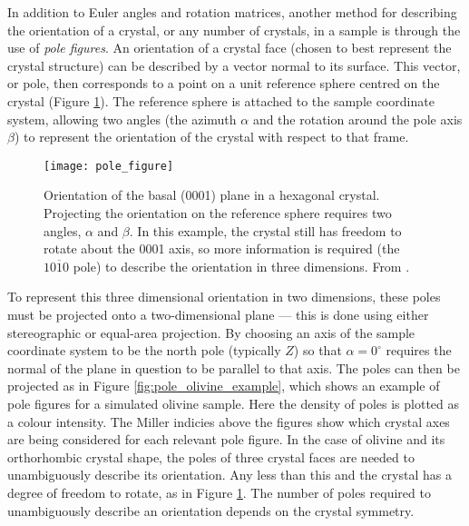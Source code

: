 \documentclass[a4paper,12pt,twoside]{report}
\numberwithin{equation}{chapter}
\begin{document}
In addition to Euler angles and rotation matrices, another method for describing the orientation of a crystal, or any number of crystals, in a sample is through the use of \emph{pole figures}. An orientation of a crystal face (chosen to best represent the crystal structure) can be described by a vector normal to its surface. This vector, or pole, then corresponds to a point on a unit reference sphere centred on the crystal (Figure \ref{fig:spherical_orientation}). The reference sphere is attached to the sample coordinate system, allowing two angles (the azimuth $\alpha$ and the rotation around the pole axis $\beta$) to represent the orientation of the crystal with respect to that frame.  




\begin{figure}[h!]
  \centering
    \texttt{[image: pole\_figure]}
  \caption[Pole figure visualisation]{Orientation of the basal (0001) plane in a hexagonal crystal. Projecting the orientation on the reference sphere requires two angles, $\alpha$ and $\beta$. In this example, the crystal still has freedom to rotate about the 0001 axis, so more information is required (the $\mathit{10\overline{1}0}$ pole) to describe the orientation in three dimensions. From \cite{Randle2000}.}
  \label{fig:spherical_orientation}
\end{figure}



To represent this three dimensional orientation in two dimensions, these poles must be projected onto a two-dimensional plane --- this is done using either stereographic or equal-area projection. By choosing an axis of the sample coordinate system to be the north pole (typically $Z$) so that $\alpha = 0^\circ$ requires the normal of the plane in question to be parallel to that axis. The poles can then be projected as in Figure \ref{fig:pole_olivine_example}, which shows an example of pole figures for a simulated olivine sample. Here the density of poles is plotted as a colour intensity. The Miller indicies above the figures show which crystal axes are being considered for each relevant pole figure. In the case of olivine and its orthorhombic crystal shape, the poles of three crystal faces are needed to unambiguously describe its orientation. Any less than this and the crystal has a degree of freedom to rotate, as in Figure \ref{fig:spherical_orientation}. The number of poles required to unambiguously describe an orientation depends on the crystal symmetry.
\end{document}

